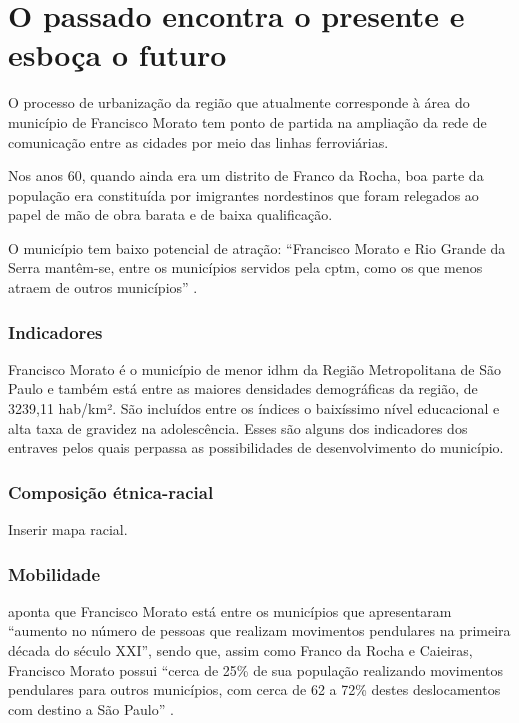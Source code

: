 	\chapter{O passado encontra o presente e esboça o futuro}
	
	O processo de urbanização da região que atualmente corresponde à área do município de Francisco Morato tem ponto de partida na ampliação da rede de comunicação entre as cidades por meio das linhas ferroviárias.
	
	Nos anos 60, quando ainda era um distrito de Franco da Rocha, boa parte da população era constituída por imigrantes nordestinos que foram relegados ao papel de mão de obra barata e de baixa qualificação.
	
	O município tem baixo potencial de atração: ``Francisco Morato e Rio Grande da Serra mantêm-se,
	entre os municípios servidos pela \gls{cptm}, como os que menos atraem de outros municípios'' \cite[p.80]{ferreira2010a}.
	
	\subsection{Indicadores}
	
	Francisco Morato é o município de menor \gls{idhm} da Região Metropolitana de São Paulo e também está entre as maiores densidades demográficas da região, de 3239,11 hab/km². São incluídos entre os índices o baixíssimo nível educacional e alta taxa de gravidez na adolescência. Esses são alguns dos indicadores dos entraves pelos quais perpassa as possibilidades de desenvolvimento do município.
	
	\subsection{Composição étnica-racial}

	Inserir mapa racial.
	
	\subsection{Mobilidade} \label{Mobilidade}
	
	 aponta que Francisco Morato está entre os municípios que apresentaram ``aumento no número de
	pessoas que realizam movimentos pendulares na primeira década do século XXI'', sendo que, assim como Franco da Rocha e Caieiras, Francisco Morato possui ``cerca de 25\% de sua população realizando movimentos pendulares para outros municípios, com cerca de 62 a 72\% destes deslocamentos com destino a São Paulo'' \cite[p.72]{suarez2014a}.
	
